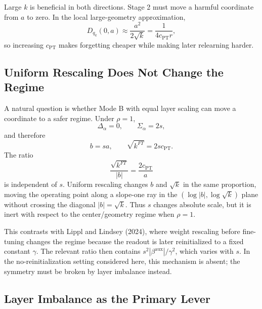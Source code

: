 \documentclass[11pt]{article}
\begin{document}
Large \(k\) is beneficial in both directions. Stage 2 must move a harmful coordinate from \(a\) to zero. In the local large-geometry approximation,
\begin{equation}
    D_{q_k}(0,a)
    \approx
    \frac{a^2}{2\sqrt{k}}
    =
    \frac{1}{4c_{\mathrm{PT}}r},
\end{equation}
so increasing \(c_{\mathrm{PT}}\) makes forgetting cheaper while making later relearning harder.

\subsection{Uniform Rescaling Does Not Change the Regime}

A natural question is whether Mode B with equal layer scaling can move a coordinate to a safer regime. Under \(\rho=1\),
\begin{equation}
    \Delta_\alpha=0,
    \qquad
    \Sigma_\alpha=2s,
\end{equation}
and therefore
\begin{equation}
    b=sa,
    \qquad
    \sqrt{k^{FT}}=2s c_{\mathrm{PT}}.
\end{equation}
The ratio
\begin{equation}
    \frac{\sqrt{k^{FT}}}{|b|}
    =
    \frac{2c_{\mathrm{PT}}}{a}
\end{equation}
is independent of \(s\). Uniform rescaling changes \(b\) and \(\sqrt{k}\) in the same proportion, moving the operating point along a slope-one ray in the \((\log|b|,\log\sqrt{k})\) plane without crossing the diagonal \(|b|=\sqrt{k}\). Thus \(s\) changes absolute scale, but it is inert with respect to the center/geometry regime when \(\rho=1\).

This contrasts with Lippl and Lindsey (2024), where weight rescaling before fine-tuning changes the regime because the readout is later reinitialized to a fixed constant \(\gamma\). The relevant ratio then contains \(s^2|\beta^{\mathrm{aux}}|/\gamma^2\), which varies with \(s\). In the no-reinitialization setting considered here, this mechanism is absent; the symmetry must be broken by layer imbalance instead.

\subsection{Layer Imbalance as the Primary Lever}
\end{document}
